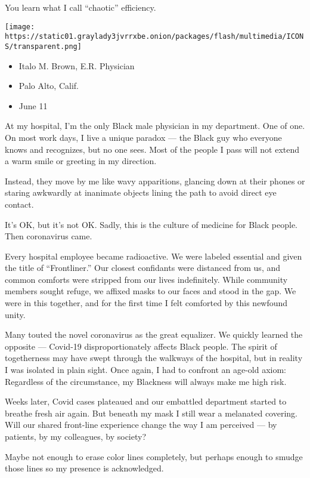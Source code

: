 You learn what I call ``chaotic'' efficiency.

\texttt{[image: https://static01.graylady3jvrrxbe.onion/packages/flash/multimedia/ICONS/transparent.png]}

\begin{itemize}
\tightlist
\item
  Italo M. Brown, E.R. Physician
\item
  Palo Alto, Calif.
\item
  June 11
\end{itemize}

At my hospital, I'm the only Black male physician in my department. One
of one. On most work days, I live a unique paradox --- the Black guy who
everyone knows and recognizes, but no one sees. Most of the people I
pass will not extend a warm smile or greeting in my direction.

Instead, they move by me like wavy apparitions, glancing down at their
phones or staring awkwardly at inanimate objects lining the path to
avoid direct eye contact.

It's OK, but it's not OK. Sadly, this is the culture of medicine for
Black people. Then coronavirus came.

Every hospital employee became radioactive. We were labeled essential
and given the title of ``Frontliner.'' Our closest confidants were
distanced from us, and common comforts were stripped from our lives
indefinitely. While community members sought refuge, we affixed masks to
our faces and stood in the gap. We were in this together, and for the
first time I felt comforted by this newfound unity.

Many touted the novel coronavirus as the great equalizer. We quickly
learned the opposite --- Covid-19 disproportionately affects Black
people. The spirit of togetherness may have swept through the walkways
of the hospital, but in reality I was isolated in plain sight. Once
again, I had to confront an age-old axiom: Regardless of the
circumstance, my Blackness will always make me high risk.

Weeks later, Covid cases plateaued and our embattled department started
to breathe fresh air again. But beneath my mask I still wear a melanated
covering. Will our shared front-line experience change the way I am
perceived --- by patients, by my colleagues, by society?

Maybe not enough to erase color lines completely, but perhaps enough to
smudge those lines so my presence is acknowledged.

